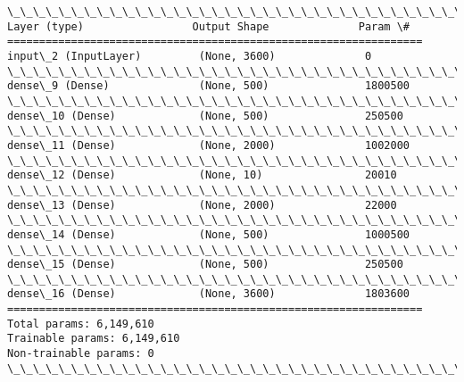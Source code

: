 \documentclass[11pt]{article}
\begin{document}
    \begin{Verbatim}[commandchars=\\\{\}]
\_\_\_\_\_\_\_\_\_\_\_\_\_\_\_\_\_\_\_\_\_\_\_\_\_\_\_\_\_\_\_\_\_\_\_\_\_\_\_\_\_\_\_\_\_\_\_\_\_\_\_\_\_\_\_\_\_\_\_\_\_\_\_\_\_
Layer (type)                 Output Shape              Param \#   
=================================================================
input\_2 (InputLayer)         (None, 3600)              0         
\_\_\_\_\_\_\_\_\_\_\_\_\_\_\_\_\_\_\_\_\_\_\_\_\_\_\_\_\_\_\_\_\_\_\_\_\_\_\_\_\_\_\_\_\_\_\_\_\_\_\_\_\_\_\_\_\_\_\_\_\_\_\_\_\_
dense\_9 (Dense)              (None, 500)               1800500   
\_\_\_\_\_\_\_\_\_\_\_\_\_\_\_\_\_\_\_\_\_\_\_\_\_\_\_\_\_\_\_\_\_\_\_\_\_\_\_\_\_\_\_\_\_\_\_\_\_\_\_\_\_\_\_\_\_\_\_\_\_\_\_\_\_
dense\_10 (Dense)             (None, 500)               250500    
\_\_\_\_\_\_\_\_\_\_\_\_\_\_\_\_\_\_\_\_\_\_\_\_\_\_\_\_\_\_\_\_\_\_\_\_\_\_\_\_\_\_\_\_\_\_\_\_\_\_\_\_\_\_\_\_\_\_\_\_\_\_\_\_\_
dense\_11 (Dense)             (None, 2000)              1002000   
\_\_\_\_\_\_\_\_\_\_\_\_\_\_\_\_\_\_\_\_\_\_\_\_\_\_\_\_\_\_\_\_\_\_\_\_\_\_\_\_\_\_\_\_\_\_\_\_\_\_\_\_\_\_\_\_\_\_\_\_\_\_\_\_\_
dense\_12 (Dense)             (None, 10)                20010     
\_\_\_\_\_\_\_\_\_\_\_\_\_\_\_\_\_\_\_\_\_\_\_\_\_\_\_\_\_\_\_\_\_\_\_\_\_\_\_\_\_\_\_\_\_\_\_\_\_\_\_\_\_\_\_\_\_\_\_\_\_\_\_\_\_
dense\_13 (Dense)             (None, 2000)              22000     
\_\_\_\_\_\_\_\_\_\_\_\_\_\_\_\_\_\_\_\_\_\_\_\_\_\_\_\_\_\_\_\_\_\_\_\_\_\_\_\_\_\_\_\_\_\_\_\_\_\_\_\_\_\_\_\_\_\_\_\_\_\_\_\_\_
dense\_14 (Dense)             (None, 500)               1000500   
\_\_\_\_\_\_\_\_\_\_\_\_\_\_\_\_\_\_\_\_\_\_\_\_\_\_\_\_\_\_\_\_\_\_\_\_\_\_\_\_\_\_\_\_\_\_\_\_\_\_\_\_\_\_\_\_\_\_\_\_\_\_\_\_\_
dense\_15 (Dense)             (None, 500)               250500    
\_\_\_\_\_\_\_\_\_\_\_\_\_\_\_\_\_\_\_\_\_\_\_\_\_\_\_\_\_\_\_\_\_\_\_\_\_\_\_\_\_\_\_\_\_\_\_\_\_\_\_\_\_\_\_\_\_\_\_\_\_\_\_\_\_
dense\_16 (Dense)             (None, 3600)              1803600   
=================================================================
Total params: 6,149,610
Trainable params: 6,149,610
Non-trainable params: 0
\_\_\_\_\_\_\_\_\_\_\_\_\_\_\_\_\_\_\_\_\_\_\_\_\_\_\_\_\_\_\_\_\_\_\_\_\_\_\_\_\_\_\_\_\_\_\_\_\_\_\_\_\_\_\_\_\_\_\_\_\_\_\_\_\_

    \end{Verbatim}
\end{document}
